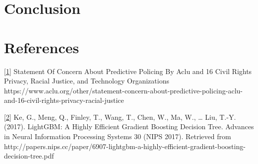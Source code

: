 \documentclass[11pt]{article}
\begin{document}
\hypertarget{conclusion}{%
\section{Conclusion}\label{conclusion}}

\hypertarget{references}{%
\section{References}\label{references}}

\href{https://www.aclu.org/other/statement-concern-about-predictive-policing-aclu-and-16-civil-rights-privacy-racial-justice}{{[}1{]}}
Statement Of Concern About Predictive Policing By Aclu and 16 Civil
Rights Privacy, Racial Justice, and Technology Organizations
https://www.aclu.org/other/statement-concern-about-predictive-policing-aclu-and-16-civil-rights-privacy-racial-justice

\href{http://papers.nips.cc/paper/6907-lightgbm-a-highly-efficient-gradient-boosting-decision-tree.pdf}{{[}2{]}}
Ke, G., Meng, Q., Finley, T., Wang, T., Chen, W., Ma, W., \ldots{} Liu,
T.-Y. (2017). LightGBM: A Highly Efficient Gradient Boosting Decision
Tree. Advances in Neural Information Processing Systems 30 (NIPS 2017).
Retrieved from
http://papers.nips.cc/paper/6907-lightgbm-a-highly-efficient-gradient-boosting-decision-tree.pdf


    
    
    
    
\end{document}
